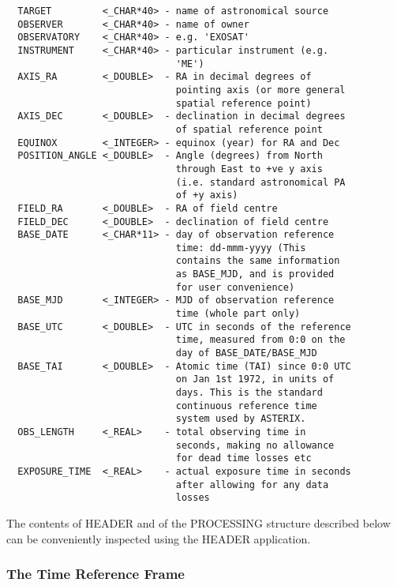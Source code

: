 \begin{verbatim}
  TARGET         <_CHAR*40> - name of astronomical source 
  OBSERVER       <_CHAR*40> - name of owner
  OBSERVATORY    <_CHAR*40> - e.g. 'EXOSAT'
  INSTRUMENT     <_CHAR*40> - particular instrument (e.g.
                              'ME') 
  AXIS_RA        <_DOUBLE>  - RA in decimal degrees of
                              pointing axis (or more general
                              spatial reference point)
  AXIS_DEC       <_DOUBLE>  - declination in decimal degrees 
                              of spatial reference point
  EQUINOX        <_INTEGER> - equinox (year) for RA and Dec
  POSITION_ANGLE <_DOUBLE>  - Angle (degrees) from North 
                              through East to +ve y axis 
                              (i.e. standard astronomical PA 
                              of +y axis) 
  FIELD_RA       <_DOUBLE>  - RA of field centre
  FIELD_DEC      <_DOUBLE>  - declination of field centre
  BASE_DATE      <_CHAR*11> - day of observation reference
                              time: dd-mmm-yyyy (This
                              contains the same information
                              as BASE_MJD, and is provided
                              for user convenience) 
  BASE_MJD       <_INTEGER> - MJD of observation reference
                              time (whole part only) 
  BASE_UTC       <_DOUBLE>  - UTC in seconds of the reference
                              time, measured from 0:0 on the
                              day of BASE_DATE/BASE_MJD 
  BASE_TAI       <_DOUBLE>  - Atomic time (TAI) since 0:0 UTC
                              on Jan 1st 1972, in units of
                              days. This is the standard
                              continuous reference time
                              system used by ASTERIX. 
  OBS_LENGTH     <_REAL>    - total observing time in
                              seconds, making no allowance
                              for dead time losses etc 
  EXPOSURE_TIME  <_REAL>    - actual exposure time in seconds
                              after allowing for any data
                              losses 
\end{verbatim}

The contents of HEADER and of the PROCESSING structure described below
can be conveniently inspected using the HEADER application.

\subsubsection{The Time Reference Frame}

